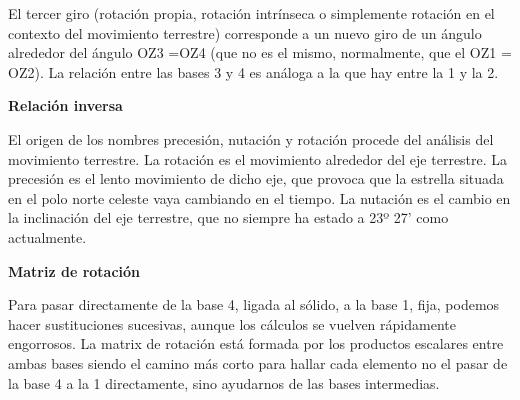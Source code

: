 \documentclass[12pt,letterpaper]{report}
\begin{document}
\begin{center}
\begin{flushleft}
\begin{flushleft}
\begin{flushleft}
\begin{flushleft}
\begin{flushleft}
\begin{flushleft}
\begin{flushleft}
\begin{flushleft}
\begin{flushleft}
\begin{flushleft}
\begin{flushleft}
El tercer giro (rotación propia, rotación intrínseca o simplemente rotación en el contexto del movimiento terrestre) corresponde a un nuevo giro de un ángulo  alrededor del ángulo OZ3 =OZ4 (que no es el mismo, normalmente, que el OZ1 = OZ2). La relación entre las bases 3 y 4 es análoga a la que hay entre la 1 y la 2.
\begin{flushleft}
\textbf{Relación inversa}
\begin{flushleft}
El origen de los nombres precesión, nutación y rotación procede del análisis del movimiento terrestre. La rotación es el movimiento alrededor del eje terrestre. La precesión es el lento movimiento de dicho eje, que provoca que la estrella situada en el polo norte celeste vaya cambiando en el tiempo. La nutación es el cambio en la inclinación del eje terrestre, que no siempre ha estado a 23º 27' como actualmente.\\

\begin{flushleft}
\textbf{Matriz de rotación}
\begin{flushleft}
Para pasar directamente de la base 4, ligada al sólido, a la base 1, fija, podemos hacer sustituciones sucesivas, aunque los cálculos se vuelven rápidamente engorrosos. La matrix de rotación está formada por los productos escalares entre ambas bases siendo el camino más corto para hallar cada elemento no el pasar de la base 4 a la 1 directamente, sino ayudarnos de las bases intermedias.
\end{flushleft}
\end{flushleft}
\end{flushleft}
\end{flushleft}
\end{flushleft}
\end{flushleft}

\end{flushleft}
\end{flushleft}
\end{flushleft}
\end{flushleft}
\end{flushleft}
\end{flushleft}
\end{flushleft}
\end{flushleft}
\end{flushleft}
\end{center}
\end{document}
